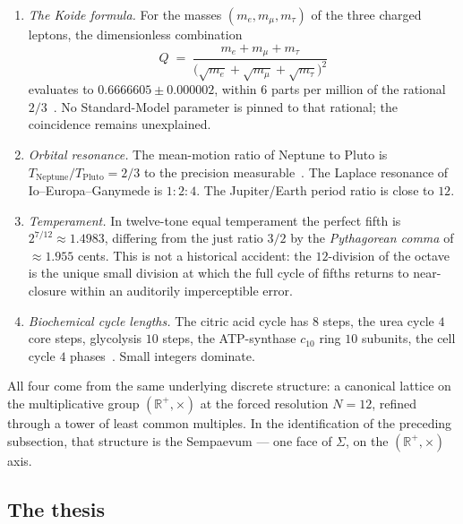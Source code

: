 \documentclass[11pt,a4paper]{article}
\theoremstyle{definition}
\theoremstyle{remark}
\newcommand{\R}{\mathbb{R}}
\begin{document}
\begin{enumerate}[leftmargin=*]
\item \emph{The Koide formula.} For the masses $(m_e,m_{\mu},m_{\tau})$ of the three charged leptons, the dimensionless combination
\[
Q \;=\; \frac{m_e+m_{\mu}+m_{\tau}}{\bigl(\sqrt{m_e}+\sqrt{m_{\mu}}+\sqrt{m_{\tau}}\bigr)^{2}}
\]
evaluates to $0.6666605\pm 0.000002$, within $6$ parts per million of the rational $2/3$~\cite{Koide1982}. No Standard-Model parameter is pinned to that rational; the coincidence remains unexplained.
\item \emph{Orbital resonance.} The mean-motion ratio of Neptune to Pluto is $T_{\mathrm{Neptune}}/T_{\mathrm{Pluto}}=2/3$ to the precision measurable~\cite{CohenHubbard1965}. The Laplace resonance of Io--Europa--Ganymede is $1{:}2{:}4$. The Jupiter/Earth period ratio is close to $12$.
\item \emph{Temperament.} In twelve-tone equal temperament the perfect fifth is $2^{7/12}\approx 1.4983$, differing from the just ratio $3/2$ by the \emph{Pythagorean comma} of $\approx 1.955$ cents. This is not a historical accident: the $12$-division of the octave is the unique small division at which the full cycle of fifths returns to near-closure within an auditorily imperceptible error.
\item \emph{Biochemical cycle lengths.} The citric acid cycle has $8$ steps, the urea cycle $4$ core steps, glycolysis $10$ steps, the ATP-synthase $c_{10}$ ring $10$ subunits, the cell cycle $4$ phases~\cite{Alberts}. Small integers dominate.
\end{enumerate}

All four come from the same underlying discrete structure: a canonical lattice on the multiplicative group $(\R^{+},\times)$ at the forced resolution $N=12$, refined through a tower of least common multiples. In the identification of the preceding subsection, that structure is the Sempaevum --- one face of $\Sigma$, on the $(\R^{+},\times)$ axis.

\subsection{The thesis}
\end{document}
